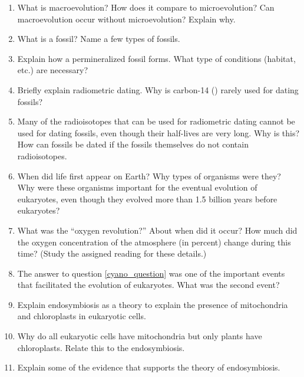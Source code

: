 \documentclass[letterpaper]{tufte-handout}
\begin{document}
\begin{enumerate}

	\item What is macroevolution? How does it compare to microevolution? Can macroevolution occur without microevolution? Explain why.
	
	\item What is a fossil? Name a few types of fossils. 

	\item Explain how a permineralized fossil forms. What type of conditions (habitat, etc.) are necessary?

	\item Briefly explain radiometric dating. Why is carbon-14 ({}) rarely used for dating fossils? 
	
	\item Many of the radioisotopes that can be used for radiometric dating cannot be used for dating fossils, even though their half-lives are very long. Why is this? How can fossils be dated if the fossils themselves do not contain radioisotopes.
	
	\item When did life first appear on Earth? Why types of organisms were they? Why were these organisms important for the eventual evolution of eukaryotes, even though they evolved more than 1.5 billion years before eukaryotes?\label{cyano_question}
	
	\item What was the ``oxygen revolution?'' About when did it occur?  How much did the oxygen concentration of the atmosphere (in percent) change during this time? (Study the assigned reading for these details.)
	
	\item The answer to question \ref{cyano_question} was one of the important events that facilitated the evolution of eukaryotes. What was the second event?
	
	\item Explain endosymbiosis  as a theory to explain the presence of mitochondria and chloroplasts in eukaryotic cells.
	
	\item Why do all eukaryotic cells have mitochondria but only plants have chloroplasts. Relate this to the endosymbiosis.
	
	\item Explain some of the evidence that supports the theory of endosymbiosis.
	
	
\end{enumerate}
\end{document}
